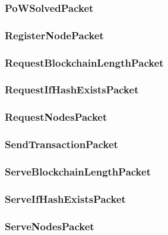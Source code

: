 \documentclass[../documentation.tex]{subfiles}
\begin{document}
\subsubsection{PoWSolvedPacket}


\subsubsection{RegisterNodePacket}


\subsubsection{RequestBlockchainLengthPacket}


\subsubsection{RequestIfHashExistsPacket}


\subsubsection{RequestNodesPacket}


\subsubsection{SendTransactionPacket}


\subsubsection{ServeBlockchainLengthPacket}


\subsubsection{ServeIfHashExistsPacket}


\subsubsection{ServeNodesPacket}

\end{document}
